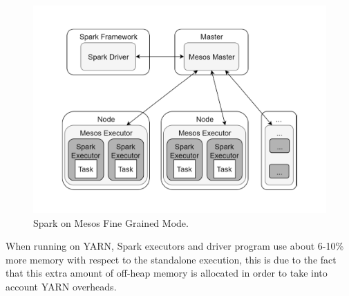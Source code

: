 \begin{figure}
	\centering
	\includegraphics[width=\columnwidth]{Images/spark_mesos_fine_grained_mode.pdf}  
	\caption[Spark on Mesos Fine Grained Mode]{Spark on Mesos Fine Grained Mode.}
	\label{fig:sparkOnMesosFineGrainedMode}
\end{figure}

When running on YARN, Spark executors and driver program use
about 6-10\% more memory with respect to the standalone execution,
this is due to the fact that this extra amount of off-heap memory is
allocated in order to take into account YARN overheads.


